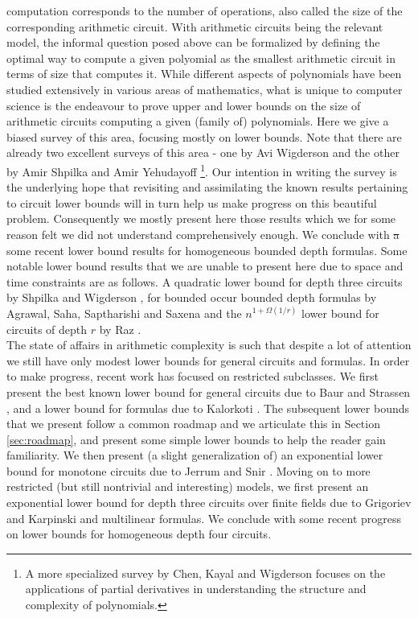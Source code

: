 \documentclass{birkjour}
\providecommand{\DIFaddtex}[1]{{\protect\color{blue}\uwave{#1}}} %
\providecommand{\DIFdeltex}[1]{{\protect\color{red}\sout{#1}}}                      %
\providecommand{\DIFaddbegin}{} %
\providecommand{\DIFaddend}{} %
\providecommand{\DIFdelbegin}{} %
\providecommand{\DIFdelend}{} %
\providecommand{\DIFadd}[1]{\texorpdfstring{\DIFaddtex{#1}}{#1}} %
\providecommand{\DIFdel}[1]{\texorpdfstring{\DIFdeltex{#1}}{}} %
\begin{document}
	computation corresponds to the number of operations, also called 
	the size of the corresponding arithmetic circuit.
	With arithmetic circuits being the relevant model, the informal 
	question posed above can be formalized by defining the optimal 
	way to compute a given polyomial as the smallest arithmetic 
	circuit in terms of \DIFaddbegin \DIFadd{the }\DIFaddend size that computes it. While different aspects 
	of polynomials have been studied extensively in various areas of 
	mathematics, what is unique to computer science is the endeavour to 
	prove upper and lower bounds on the size of arithmetic circuits 
	computing a given (family of) polynomials. Here we give a biased 
	survey of this area, focusing mostly on lower bounds. Note that
	there are already two excellent surveys of this area - one by Avi 
	Wigderson \cite{aviSurvey} and the other by Amir Shpilka and Amir 
	Yehudayoff \cite{sy}\footnote{
		A more specialized survey by Chen, Kayal and Wigderson \cite{ckw11}
		focuses on the applications of partial derivatives in understanding 
		the structure and complexity of polynomials. 
	}. Our intention in writing the survey is the underlying hope 
	that revisiting and assimilating the known results pertaining to 
	circuit lower bounds will in turn help us make progress on this 
	beautiful problem. Consequently we mostly present here those 
	results which we for some reason felt we did not understand 
	comprehensively enough. We conclude with \DIFdelbegin \DIFdel{a }\DIFdelend some recent lower 
	bound results for homogeneous bounded depth formulas. Some 
	notable lower bound results that we are unable to present 
	here due to space and time constraints are as follows. A 
	quadratic lower bound for depth three circuits by Shpilka and Wigderson \cite{sw2001}, for bounded occur 
	bounded depth formulas by Agrawal, Saha, Saptharishi and 
	Saxena \cite{ASSS12} and the $n^{1 + \Omega(1/r)}$ lower bound for 
	circuits of depth $r$ by Raz \cite{raz10}.\\

The state of affairs in arithmetic complexity is such that despite a
lot of attention we still have only modest lower bounds for general
circuits and formulas. In order to make progress, recent work has
focused on restricted subclasses.  We first present the best known
lower bound for general circuits due to Baur and Strassen \cite{BS83},
and a lower bound for formulas due to Kalorkoti
\cite{k85}. The subsequent lower bounds that we present
follow a common roadmap and we articulate this in Section
\ref{sec:roadmap}, and present some simple lower bounds to help the
reader gain familiarity. We then present (a slight generalization of)
an exponential lower bound for monotone circuits due to Jerrum and
Snir \cite{js82}.  Moving on to more restricted (but still nontrivial
and interesting) models, we first present an exponential lower bound
for depth three circuits over finite fields due to Grigoriev and
Karpinski \cite{grigoriev98} and multilinear formulas. We conclude
with some recent progress on lower bounds for homogeneous depth four
circuits.
\end{document}
